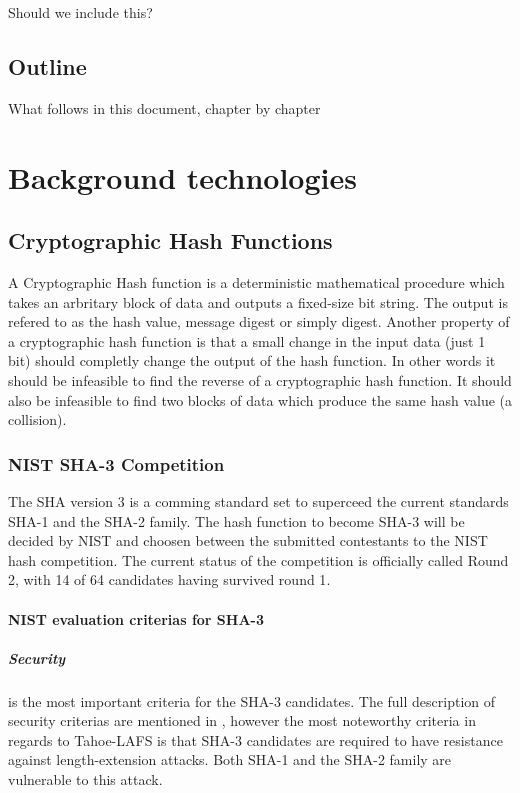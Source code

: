 \documentclass[english,12pt,a4paper]{book}
\begin{document}
Should we include this?

\section{Outline}

What follows in this document, chapter by chapter


\chapter{Background technologies}

\section{Cryptographic Hash Functions}
A Cryptographic Hash function is a deterministic mathematical procedure which
takes an arbritary block of data and outputs a fixed-size bit string. The
output is refered to as the hash value, message digest or simply digest.
Another property of a cryptographic hash function is that a small change in the
input data (just 1 bit) should completly change the output of the hash
function. In other words it should be infeasible to find the reverse of a
cryptographic hash function. It should also be infeasible to find two blocks of
data which produce the same hash value (a collision).

\subsection{NIST SHA-3 Competition}
The \ac{SHA} version 3 is a comming standard set to superceed the current
standards \ac{SHA}-1 and the \ac{SHA}-2 family. The hash function to become
\ac{SHA}-3 will be decided by \ac{NIST} and choosen between the submitted
contestants to the \ac{NIST} hash competition. The current status of the 
competition is officially called Round 2, with 14 of 64 candidates having 
survived round 1\cite{s_fedreg}. 

\subsubsection{\ac{NIST} evaluation criterias for \ac{SHA}-3}

\paragraph{Security} is the most important criteria for the SHA-3
candidates\cite{s_nistround2}. The full description of security criterias are
mentioned in \cite{s_fedreg}, however the most noteworthy criteria in regards
to Tahoe-\ac{LAFS} is that \ac{SHA}-3 candidates are required to have
resistance against length-extension attacks. Both \ac{SHA}-1 and the \ac{SHA}-2
family are vulnerable to this attack\cite{s_mdre}.
\end{document}
